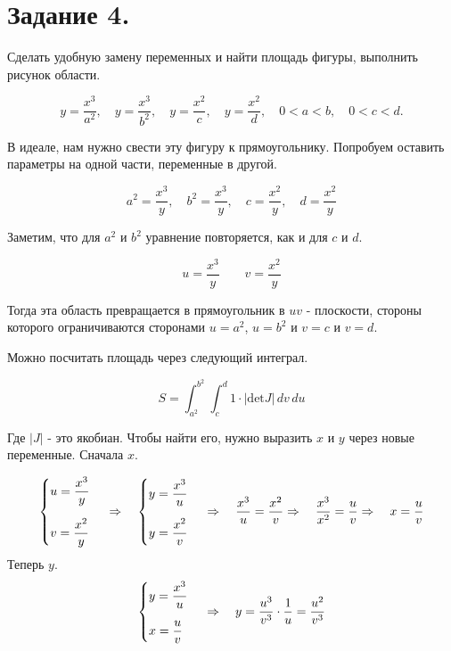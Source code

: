\newpage
\section{Задание 4.}

Сделать удобную замену переменных и найти площадь фигуры, выполнить
рисунок области.

$$    y = \frac{x^3}{a^2}, \quad y = \frac{x^3}{b^2}, \quad y = \frac{x^2}{c}, \quad y = \frac{x^2}{d}, \quad 0 < a < b, \quad 0 < c < d.$$

В идеале, нам нужно свести эту фигуру к прямоугольнику. Попробуем оставить параметры на одной части, переменные в другой.

$$ a^2 = \frac{x^3}{y}, \quad b^2 = \frac{x^3}{y}, \quad c = \frac{x^2}{y}, \quad d = \frac{x^2}{y}$$

Заметим, что для $a^2$ и $b^2$ уравнение повторяется, как и для $c$ и $d$.

$$ u = \dfrac{x^3}{y}\quad\quad v = \dfrac{x^2}{y} $$

Тогда эта область превращается в прямоугольник в $uv$ - плоскости, стороны которого ограничиваются сторонами $u=a^2$, $u=b^2$ и $v=c$ и $v=d$.

Можно посчитать площадь через следующий интеграл.

$$S = \int_{a^2}^{b^2} \int_{c}^{d} 1\cdot \left| \text{det}J\right| \,dv\,du$$

Где $\left|J\right|$ - это якобиан. Чтобы найти его, нужно выразить $x$ и $y$ через новые переменные. Сначала $x$.

$$
\begin{cases}
    u = \dfrac{x^3}{y}\,\vspace{1em}\\ 
    v = \dfrac{x^2}{y} 
\end{cases} \Rightarrow \quad
\begin{cases}
    y = \dfrac{x^3}{u}\,\vspace{1em}\\ 
    y = \dfrac{x^2}{v} 
\end{cases} \Rightarrow \quad
\dfrac{x^3}{u} = \dfrac{x^2}{v} \Rightarrow \quad
\dfrac{x^3}{x^2} = \dfrac{u}{v} \Rightarrow \quad
x = \dfrac{u}{v}
$$
Теперь $y$.
$$
\begin{cases}
    y = \dfrac{x^3}{u}\,\vspace{1em}\\ 
    x = \dfrac{u}{v}
\end{cases} \Rightarrow \quad 
y = \dfrac{u^3}{v^3} \cdot \dfrac{1}{u} = \dfrac{u^2}{v^3}
$$

